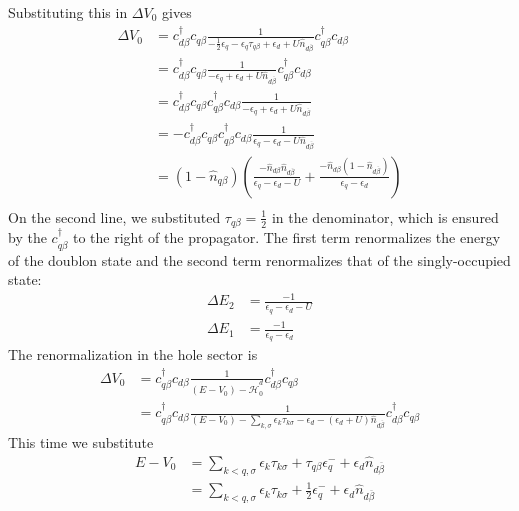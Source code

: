 Substituting this in \(\Delta V_0\) gives
\begin{equation}\begin{aligned}
\Delta V_0 &=  c^\dagger_{d\beta}c_{q\beta}\frac{1}{-\frac{1}{2}\epsilon_q -\epsilon_q \tau_{q\beta} + \epsilon_d + U\hat n_{d\overline\beta}}c^\dagger_{q\beta}c_{d\beta}\\
&=  c^\dagger_{d\beta}c_{q\beta}\frac{1}{-\epsilon_q + \epsilon_d + U\hat n_{d\overline\beta}}c^\dagger_{q\beta}c_{d\beta}\\
&=  c^\dagger_{d\beta}c_{q\beta}c^\dagger_{q\beta}c_{d\beta}\frac{1}{-\epsilon_q + \epsilon_d + U\hat n_{d\overline\beta}}\\
&=  -c^\dagger_{d\beta}c_{q\beta}c^\dagger_{q\beta}c_{d\beta}\frac{1}{\epsilon_q - \epsilon_d - U\hat n_{d\overline\beta}}\\
&=  \left(1 - \hat n_{q\beta}\right)\left(\frac{-\hat n_{d\beta}\hat n_{d\overline\beta}}{\epsilon_q - \epsilon_d - U} + \frac{-\hat n_{d\beta}\left(1 - \hat n_{d\overline\beta}\right)}{\epsilon_q - \epsilon_d}\right)\\
\end{aligned}\end{equation}
On the second line, we substituted \(\tau_{q\beta} = \frac{1}{2}\) in the denominator, which is ensured by the \(c^\dagger_{q\beta}\) to the right of the propagator. The first term renormalizes the energy of the doublon state and the second term renormalizes that of the singly-occupied state:
\begin{equation}\begin{aligned}
\Delta E_2 &= \frac{-1}{\epsilon_q - \epsilon_d - U}\\
\Delta E_1 &= \frac{-1}{\epsilon_q - \epsilon_d}
\end{aligned}\end{equation}
The renormalization in the hole sector is
\begin{equation}\begin{aligned}
	\Delta V_0 &=  c^\dagger_{q\beta}c_{d\beta}\frac{1}{\left(E - V_0\right) - \hat {\mathcal{H}}^d_0}c^\dagger_{d\beta}c_{q\beta}\\
		   &=  c^\dagger_{q\beta}c_{d\beta}\frac{1}{\left(E - V_0\right) - \sum_{k,\sigma}\epsilon_k\tau_{k\sigma} - \epsilon_d - \left(\epsilon_d + U\right)\hat n_{d\overline\beta}}c^\dagger_{d\beta}c_{q\beta}
\end{aligned}\end{equation}
This time we substitute
\begin{equation}\begin{aligned}
E - V_0 &= \sum_{k<q,\sigma}\epsilon_k \tau_{k\sigma} + \tau_{q\beta} \epsilon^-_q + \epsilon_d\hat n_{d\overline\beta}\\
&= \sum_{k<q,\sigma}\epsilon_k \tau_{k\sigma} + \frac{1}{2} \epsilon^-_q + \epsilon_d\hat n_{d\overline\beta}\\
\end{aligned}\end{equation}

